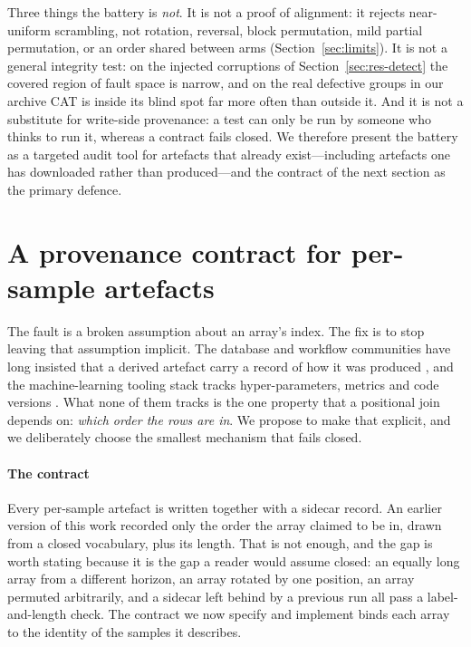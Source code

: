 \documentclass[a4paper,fleqn]{cas-sc}
\begin{document}
Three things the battery is \emph{not}. It is not a proof of alignment: it
rejects near-uniform scrambling, not rotation, reversal, block permutation, mild
partial permutation, or an order shared between arms
(Section~\ref{sec:limits}). It is not a general integrity test: on the injected
corruptions of Section~\ref{sec:res-detect} the covered region of fault space is
narrow, and on the real defective groups in our archive CAT is inside its blind
spot far more often than outside it. And it is not a substitute for write-side
provenance: a test can only be run by someone who thinks to run it, whereas a
contract fails
closed. We therefore present the battery as a targeted audit tool for artefacts
that
already exist---including artefacts one has downloaded rather than produced---and
the contract of the next section as the primary defence.

\section{A provenance contract for per-sample artefacts}
\label{sec:contract}

The fault is a broken assumption about an array's index. The fix is to stop
leaving that assumption implicit. The database and workflow communities have long
insisted that a derived artefact carry a record of how it was produced
\citep{cheney2009,herschel2017,ditommaso2017,koster2012}, and the machine-learning
tooling stack tracks hyper-parameters, metrics and code versions
\citep{zaharia2018mlflow}. What none of them tracks is the one property that a
positional join depends on: \emph{which order the rows are in}. We propose to make
that explicit, and we deliberately choose the smallest mechanism that fails
closed.

\paragraph{The contract}
Every per-sample artefact is written together with a sidecar record. An earlier
version of this work recorded only the order the array claimed to be in, drawn
from a closed vocabulary, plus its length. That is not enough, and the gap is
worth stating because it is the gap a reader would assume closed: an
equally long array from a different horizon, an array rotated by one position, an
array permuted arbitrarily, and a sidecar left behind by a previous run all pass a
label-and-length check. The contract we now specify and implement binds each array
to the identity of the samples it describes.
\end{document}
